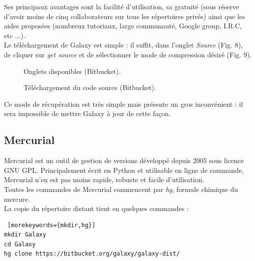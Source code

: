 Ses principaux avantages sont la facilité d'utilisation, sa gratuité (sous réserve d'avoir moins de cinq collaborateurs sur tous les répertoires privés) ainsi que les aides proposées (nombreux tutoriaux, large communauté, Google group, I.R.C, etc ...).\\

Le téléchargement de Galaxy est simple : il suffit, dans l'onglet \textit{Source} (Fig. 8), de cliquer sur \textit{get source} et de sélectionner le mode de compression désiré (Fig. 9).

\begin{figure}[!h]
 \centering
{}
\caption{Onglets disponibles (Bitbucket).}
\end{figure}
\begin{figure}[!h]
 \centering
{}
\caption{Téléchargement du code source (Bitbucket).}
\end{figure}

Ce mode de récupération est très simple mais présente un gros inconvénient : il sera impossible de mettre Galaxy à jour de cette façon.

\subsection*{Mercurial}

Mercurial est un outil de gestion de versions développé depuis 2005 sous licence GNU GPL. Principalement écrit en Python et utilisable en ligne de commande, Mercurial n'en est pas moins rapide, robuste et facile d'utilisation.\\

Toutes les commandes de Mercurial commencent par \textit{hg}, formule chimique du mercure.\\

La copie du répertoire distant tient en quelques commandes : 
\lstset{language=sh}
\begin{lstlisting} [morekeywords={mkdir,hg}]
mkdir Galaxy
cd Galaxy
hg clone https://bitbucket.org/galaxy/galaxy-dist/
 \end{lstlisting} 

